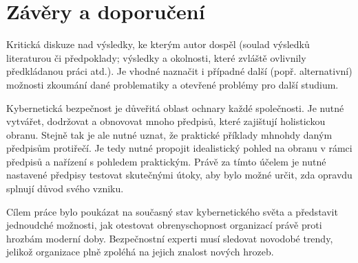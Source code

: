
\section{Závěry a doporučení}\label{sec:zavery-a-doporuceni}


Kritická diskuze nad výsledky, ke kterým autor dospěl (soulad výsledků  literaturou či předpoklady;
výsledky a okolnosti, které zvláště ovlivnily předkládanou práci atd.).
Je vhodné naznačit i případné další
(popř. alternativní) možnosti zkoumání dané problematiky a otevřené problémy pro další studium.


Kybernetická bezpečnost je důveřitá oblast ochnary každé společnosti.
Je nutné vytvářet, dodržovat a obnovovat mnoho předpisů, které zajištují holistickou obranu.
Stejně tak je ale nutné uznat, že praktické příklady mhnohdy daným předpisům protiřečí.
Je tedy nutné propojit idealistický pohled na obranu v rámci předpisů a nařízení s pohledem praktickým.
Právě za tímto účelem je nutné nastavené předpisy testovat skutečnými útoky, aby bylo možné určit, zda opravdu splnují důvod svého vzniku.

Cílem práce bylo poukázat na současný stav kybernetického světa a představit jednoudché možnosti, jak otestovat obrenyschopnost organizací právě proti hrozbám moderní doby.%
Bezpečnostní experti musí sledovat novodobé trendy, jelikož organizace plně zpoléhá na jejich znalost nových hrozeb.

